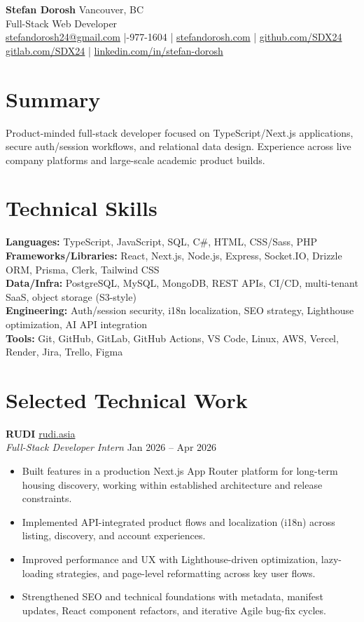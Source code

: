 \documentclass[10pt,letterpaper]{article}
\begin{document}
{\LARGE \textbf{Stefan Dorosh}} \hfill Vancouver, BC \\
Full-Stack Web Developer \\
\href{mailto:stefandorosh24@gmail.com}{stefandorosh24@gmail.com} \;|-977-1604 \;|\;
\href{https://stefandorosh.com}{stefandorosh.com} \;|\;
\href{https://github.com/SDX24}{github.com/SDX24} \\
\href{https://gitlab.com/SDX24}{gitlab.com/SDX24} \;|\;
\href{https://linkedin.com/in/stefan-dorosh}{linkedin.com/in/stefan-dorosh}

\section*{Summary}
Product-minded full-stack developer focused on TypeScript/Next.js applications, secure auth/session workflows, and relational data design. Experience across live company platforms and large-scale academic product builds.

\section*{Technical Skills}
\textbf{Languages:} TypeScript, JavaScript, SQL, C\#, HTML, CSS/Sass, PHP \\
\textbf{Frameworks/Libraries:} React, Next.js, Node.js, Express, Socket.IO, Drizzle ORM, Prisma, Clerk, Tailwind CSS \\
\textbf{Data/Infra:} PostgreSQL, MySQL, MongoDB, REST APIs, CI/CD, multi-tenant SaaS, object storage (S3-style) \\
\textbf{Engineering:} Auth/session security, i18n localization, SEO strategy, Lighthouse optimization, AI API integration \\
\textbf{Tools:} Git, GitHub, GitLab, GitHub Actions, VS Code, Linux, AWS, Vercel, Render, Jira, Trello, Figma

\section*{Selected Technical Work}
\textbf{RUDI} \hfill \href{https://rudi.asia}{rudi.asia} \\
\textit{Full-Stack Developer Intern} \hfill Jan 2026 -- Apr 2026 \\
\begin{itemize}
  \item Built features in a production Next.js App Router platform for long-term housing discovery, working within established architecture and release constraints.
  \item Implemented API-integrated product flows and localization (i18n) across listing, discovery, and account experiences.
  \item Improved performance and UX with Lighthouse-driven optimization, lazy-loading strategies, and page-level reformatting across key user flows.
  \item Strengthened SEO and technical foundations with metadata, manifest updates, React component refactors, and iterative Agile bug-fix cycles.
\end{itemize}
\end{document}

